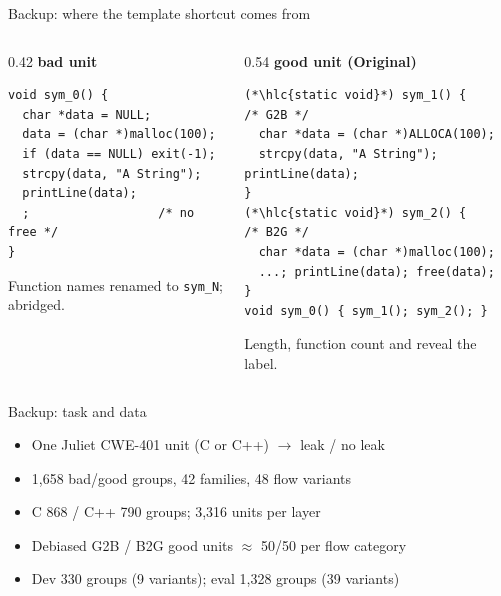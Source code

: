 
\begin{frame}[fragile]{Backup: where the template shortcut comes from}
  \begin{columns}[T]
    \begin{column}{0.42\textwidth}
      \textbf{bad unit}\\[1pt]
\begin{lstlisting}[style=unit]
void sym_0() {
  char *data = NULL;
  data = (char *)malloc(100);
  if (data == NULL) exit(-1);
  strcpy(data, "A String");
  printLine(data);
  ;                  /* no free */
}
\end{lstlisting}
      {\small Function names renamed to \texttt{sym\_N}; abridged.}
    \end{column}
    \begin{column}{0.54\textwidth}
      \textbf{good unit (Original)}\\[1pt]
\begin{lstlisting}[style=unit]
(*\hlc{static void}*) sym_1() {        /* G2B */
  char *data = (char *)ALLOCA(100);
  strcpy(data, "A String"); printLine(data);
}
(*\hlc{static void}*) sym_2() {        /* B2G */
  char *data = (char *)malloc(100);
  ...; printLine(data); free(data);
}
void sym_0() { sym_1(); sym_2(); }
\end{lstlisting}
      {\small Length, function count and  reveal the label.}
    \end{column}
  \end{columns}
\end{frame}

\begin{frame}{Backup: task and data}
  \begin{itemize}
    \item One Juliet CWE-401 unit (C or C++) $\to$ leak / no leak
    \item 1,658 bad/good groups, 42 families, 48 flow variants
    \item C 868 / C++ 790 groups; 3,316 units per layer
    \item Debiased G2B / B2G good units $\approx$ 50/50 per flow category
    \item Dev 330 groups (9 variants); eval 1,328 groups (39 variants)
  \end{itemize}
\end{frame}

